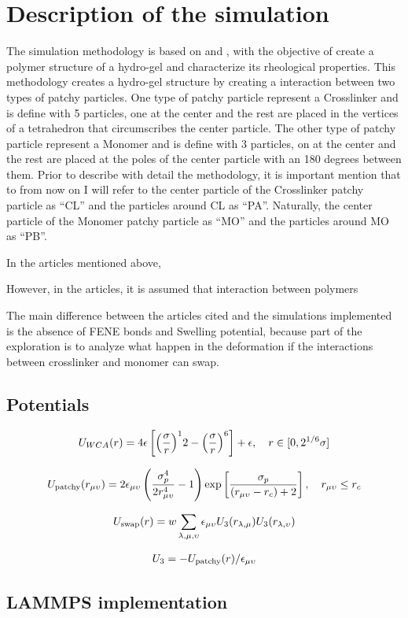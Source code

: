 \documentclass[main.tex]{subfiles}
\begin{document}
\section{Description of the simulation}

The simulation methodology is based on \cite{gnanSilicoSynthesisMicrogel2017} and \cite{sorichettiStructureElasticityModel2023}, with the objective of create a polymer structure of a hydro-gel and characterize its rheological properties.
This methodology creates a hydro-gel structure by creating a interaction between two types of patchy particles.
One type of patchy particle represent a Crosslinker and is define with 5 particles, one at the center and the rest are placed in the vertices of a tetrahedron that circumscribes the center particle.
The other type of patchy particle represent a Monomer and is define with 3 particles, on at the center and the rest are placed at the poles of the center particle with an 180 degrees between them.
Prior to describe with detail the methodology, it is important mention that to from now on I will refer to the center particle of the Crosslinker patchy particle as ``CL'' and the particles around CL as ``PA''.
Naturally, the center particle of the Monomer patchy particle as ``MO'' and the particles around MO as ``PB''.



In the articles mentioned above, 

However, in the articles, it is assumed that interaction between polymers

The main difference between the articles cited and the simulations implemented is the absence of FENE bonds and Swelling potential, because part of the exploration is to analyze what happen in the deformation if the interactions between crosslinker and monomer can swap.

\subsection{Potentials}

\begin{gather}
		U_{WCA}(r) = 4\epsilon\left[\qty(\frac{\sigma}{r})^12-\qty(\frac{\sigma}{r})^6\right]+\epsilon,\quad r\in[0,2^{1/6}\sigma]
\end{gather}

\begin{gather}
	U_{\mathrm{patchy}}\qty(r_{\mu\upsilon}) = 2\epsilon_{\mu\upsilon}\left(\frac{\sigma_p^4}{2 r_{\mu\upsilon}^4}-1\right)\exp\left[\frac{\sigma_p}{\qty(r_{\mu\upsilon}-r_{c})+2}\right],\quad r_{\mu\upsilon}\leq r_c
\end{gather}

\begin{gather}
	U_{\mathrm{swap}}(r) = w\sum_{\lambda,\mu,\upsilon}\epsilon_{\mu\upsilon}U_3\qty(r_{\lambda,\mu})U_3\qty(r_{\lambda,\upsilon})
\end{gather}

\begin{gather}
	U_{3} = -U_{\mathrm{patchy}}\qty(r)/\epsilon_{\mu\upsilon}
\end{gather}

\subsection{LAMMPS implementation}
\end{document}
